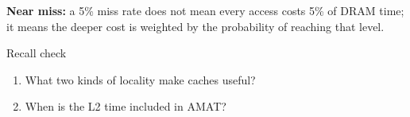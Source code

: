 \documentclass[11pt]{article}
\begin{document}
\begin{keepsection}
\begin{notebox}\textbf{Near miss:} a 5\% miss rate does not mean every access costs 5\% of DRAM time; it means the deeper cost is weighted by the probability of reaching that level.\end{notebox}

\begin{recallbox}{Recall check}
\begin{enumerate}
\item What two kinds of locality make caches useful?
\item When is the L2 time included in AMAT?
\end{enumerate}

\end{recallbox}
\end{keepsection}
\end{document}
